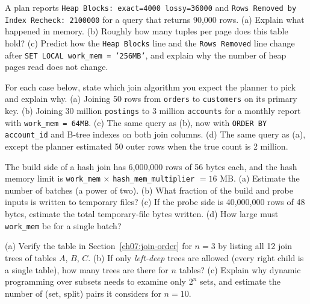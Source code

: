 \begin{exercise}
A plan reports \texttt{Heap Blocks: exact=4000 lossy=36000} and \texttt{Rows Removed by Index Recheck: 2100000} for a query that returns 90,000 rows. (a) Explain what happened in memory. (b) Roughly how many tuples per page does this table hold? (c) Predict how the \texttt{Heap Blocks} line and the \texttt{Rows Removed} line change after \texttt{SET LOCAL work\_mem = '256MB'}, and explain why the number of heap pages read does not change.
\end{exercise}

\begin{exercise}
For each case below, state which join algorithm you expect the planner to pick and explain why.
(a) Joining 50 rows from \texttt{orders} to \texttt{customers} on its primary key.
(b) Joining 30 million \texttt{postings} to 3 million \texttt{accounts} for a monthly report with \texttt{work\_mem = 64MB}.
(c) The same query as (b), now with \texttt{ORDER BY account\_id} and B-tree indexes on both join columns.
(d) The same query as (a), except the planner estimated 50 outer rows when the true count is 2 million.
\end{exercise}

\begin{exercise}
The build side of a hash join has 6,000,000 rows of 56 bytes each, and the hash memory limit is \texttt{work\_mem} $\times$ \texttt{hash\_mem\_multiplier} $= 16\text{ MB}$. (a) Estimate the number of batches (a power of two). (b) What fraction of the build and probe inputs is written to temporary files? (c) If the probe side is 40,000,000 rows of 48 bytes, estimate the total temporary-file bytes written. (d) How large must \texttt{work\_mem} be for a single batch?
\end{exercise}

\begin{exercise}
(a) Verify the table in Section~\ref{ch07:join-order} for $n = 3$ by listing all 12 join trees of tables $A$, $B$, $C$. (b) If only \emph{left-deep} trees are allowed (every right child is a single table), how many trees are there for $n$ tables? (c) Explain why dynamic programming over subsets needs to examine only $2^n$ sets, and estimate the number of (set, split) pairs it considers for $n = 10$.
\end{exercise}

